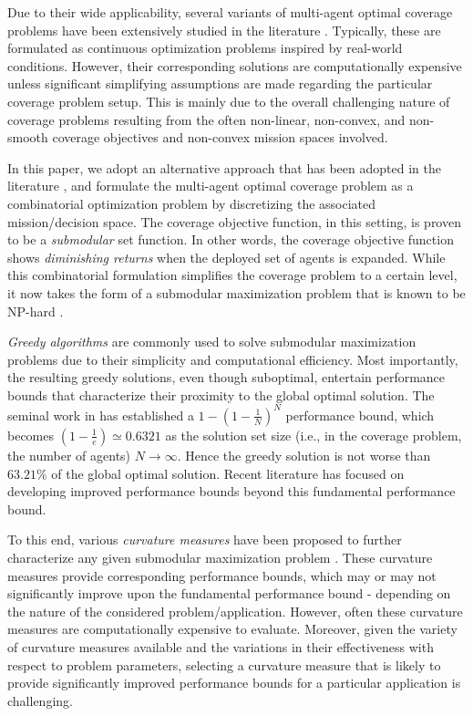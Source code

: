 \documentclass[letterpaper, 10 pt, conference]{ieeeconf}
\begin{document}
Due to their wide applicability, several variants of multi-agent optimal coverage problems have been extensively studied in the literature \cite{Zhong2011,Luo2019,Welikala2019J1}. Typically, these are formulated as continuous optimization problems inspired by real-world conditions. However, their corresponding solutions are computationally expensive unless significant simplifying assumptions are made regarding the particular coverage problem setup. This is mainly due to the overall challenging nature of coverage problems resulting from the often non-linear, non-convex, and non-smooth coverage objectives and non-convex mission spaces involved.   

In this paper, we adopt an alternative approach that has been adopted in the literature \cite{Sun2019,Sun2020}, and formulate the multi-agent optimal coverage problem as a combinatorial optimization problem by discretizing the associated mission/decision space. The coverage objective function, in this setting, is proven to be a \emph{submodular} set function. In other words, the coverage objective function shows \emph{diminishing returns} when the deployed set of agents is expanded. While this combinatorial formulation simplifies the coverage problem to a certain level, it now takes the form of a submodular maximization problem that is known to be NP-hard \cite{Nemhauser1978}.    

\emph{Greedy algorithms} are commonly used to solve submodular maximization problems due to their simplicity and computational efficiency. Most importantly, the resulting greedy solutions, even though suboptimal, entertain performance bounds that characterize their proximity to the global optimal solution. The seminal work in \cite{Nemhauser1978} has established a $1-(1-\frac{1}{N})^N$ performance bound, which becomes $(1-\frac{1}{e}) \simeq 0.6321$ as the solution set size (i.e., in the coverage problem, the number of agents) $N\rightarrow \infty$. Hence the greedy solution is not worse than $63.21\%$ of the global optimal solution. Recent literature has focused on developing improved performance bounds beyond this fundamental performance bound. 


To this end, various \emph{curvature measures} have been proposed to further characterize any given submodular maximization problem \cite{Conforti1984,Wang2016,Liu2018,WelikalaJ02021}. These curvature measures provide corresponding performance bounds, which may or may not significantly improve upon the fundamental performance bound - depending on the nature of the considered problem/application. However, often these curvature measures are computationally expensive to evaluate. Moreover, given the variety of curvature measures available and the variations in their effectiveness with respect to problem parameters, selecting a curvature measure that is likely to provide significantly improved performance bounds for a particular application is challenging.    
\end{document}
